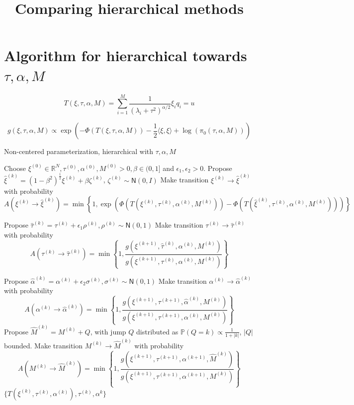 \documentclass{siamart1116}
\title{Comparing hierarchical methods}
\author{\TheAuthors}
\date{}
\begin{document}
\maketitle
\setlength{\unitlength}{1in}
\setlength{\parindent}{0in}
\section{Algorithm for hierarchical towards $\tau, \alpha, M$}
\begin{equation}
\label{eqn:noncentered_T}
T(\xi,\tau,\alpha, M) = \sum_{i=1}^M \frac{1}{(\lambda_i+\tau^2)^{\alpha/2}}\xi_iq_i = u
\end{equation}


\begin{equation}
\label{eqn:noncentered_post}
g(\xi,\tau,\alpha, M) \propto \exp\left( -\Phi(T(\xi,\tau,\alpha,M))-\frac{1}{2}\langle \xi,\xi \rangle + \log(\pi_0(\tau,\alpha,M)) \right)
\end{equation}


\begin{algorithm}

\caption{Non-centered parameterization, hierarchical with $\tau, \alpha, M$}
\label{alg:hier_t_a_M}
\begin{algorithmic}
\State Choose $\xi^{(0)} \in \mathbb{R}^N, \tau^{(0)}, \alpha^{(0)}, M^{(0)} > 0, \beta \in (0, 1]$ and $\epsilon_1, \epsilon_2 > 0$.
\State Propose $\hat\xi^{(k)} = (1-\beta^2)^{\frac{1}{2}}\xi^{(k)} + \beta \zeta^{(k)}$, $\zeta^{(k)} \sim \mathsf{N}(0, I)$
\State Make transition $\xi^{(k)} \to \hat\xi^{(k)}$ with probability
\[ A(\xi^{(k)} \to \hat\xi^{(k)}) = \min\left\{1, \exp\left(\Phi(T(\xi^{(k)},\tau^{(k)},\alpha^{(k)}, M^{(k)})) - \Phi(T(\hat\xi^{(k)},\tau^{(k)},\alpha^{(k)}, M^{(k)}))\right) \right\}\] 

\State Propose $\hat\tau^{(k)} = \tau^{(k)} + \epsilon_1 \rho^{(k)}, \rho^{(k)} \sim \mathsf{N}(0,1)$
\State Make transition $\tau^{(k)} \to \hat\tau^{(k)}$ with probability
\[ A(\tau^{(k)} \to \hat\tau^{(k)}) 
= \min\left\{1, \frac{g(\xi^{(k+1)},\hat\tau^{(k)},\alpha^{(k)},M^{(k)})}{g(\xi^{(k+1)},\tau^{(k)},\alpha^{(k)},M^{(k)})} \right\}\] 

\State Propose $\hat\alpha^{(k)} = \alpha^{(k)} + \epsilon_2 \sigma^{(k)}, \sigma^{(k)} \sim \mathsf{N}(0,1)$
\State Make transition $\alpha^{(k)} \to \hat\alpha^{(k)}$ with probability
\[ A(\alpha^{(k)} \to \hat\alpha^{(k)}) 
= \min\left\{1, \frac{g(\xi^{(k+1)},\tau^{(k+1)},\hat \alpha^{(k)},M^{(k)})}{g(\xi^{(k+1)},\tau^{(k+1)},\alpha^{(k)},M^{(k)})} \right\}\]
\State Propose $\hat M^{(k)} = M^{(k)} + Q$, with jump $Q$ distributed as $\mathbb{P}(Q=k) \propto \frac{1}{1+|k|}$, $|Q|$ bounded.
\State Make transition $M^{(k)} \to \hat M^{(k)}$ with probability
\[ A(M^{(k)} \to \hat M^{(k)}) = 
\min\left\{1, \frac{g(\xi^{(k+1)},\tau^{(k+1)},\alpha^{(k+1)},\hat M^{(k)})}{g(\xi^{(k+1)},\tau^{(k+1)},\alpha^{(k+1)},M^{(k)})} \right\}
\]
\EndFor
\State \Return $\{ T(\xi^{(k)},\tau^{(k)},\alpha^{(k)}), \tau^{(k)}, \alpha^{k} \}$
\end{algorithmic}
\end{algorithm}
\end{document}
